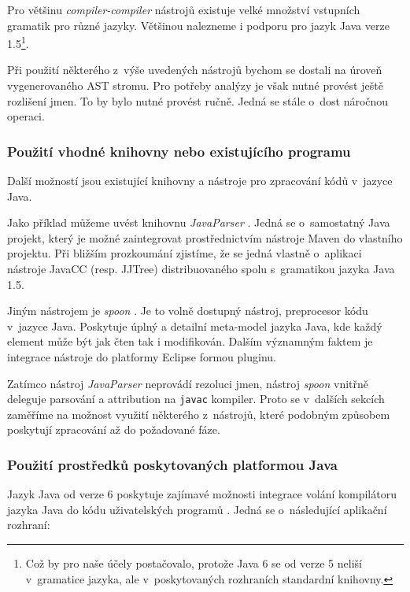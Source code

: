 \vspace{0.5cm}

Pro většinu \emph{compiler-compiler} nástrojů existuje velké množství vstupních gramatik pro různé jazyky. Většinou nalezneme i podporu pro jazyk Java verze 1.5\footnote{Což by pro naše účely postačovalo, protože Java 6 se od verze 5 neliší v~gramatice jazyka, ale v~poskytovaných rozhraních standardní knihovny.}.

Při použití některého z~výše uvedených nástrojů bychom se dostali na úroveň vygenerovaného AST stromu. Pro potřeby analýzy je však nutné provést ještě rozlišení jmen. To by bylo nutné provést ručně. Jedná se stále o~dost náročnou operaci.

\subsubsection{Použití vhodné knihovny nebo existujícího programu}
Další možností jsou existující knihovny a nástroje pro zpracování kódů v~jazyce Java.

Jako příklad můžeme uvést knihovnu \emph{JavaParser} \cite{parsertools:javaparser}. Jedná se o~samostatný Java projekt, který je možné zaintegrovat prostřednictvím nástroje Maven do vlastního projektu. Při bližším prozkoumání zjistíme, že se jedná vlastně o~aplikaci nástroje JavaCC (resp. JJTree) distribuovaného spolu s~gramatikou jazyka Java 1.5.

Jiným nástrojem je \emph{spoon} \cite{parsertools:spoon}. Je to volně dostupný nástroj, preprocesor kódu v~jazyce Java. Poskytuje úplný a detailní meta-model jazyka Java, kde každý element může být jak čten tak i modifikován. Dalším významným faktem je integrace nástroje do platformy Eclipse formou pluginu.

Zatímco nástroj \emph{JavaParser} neprovádí rezoluci jmen, nástroj \emph{spoon} vnitřně deleguje parsování a attribution na \verb+javac+ kompiler. Proto se v~dalších sekcích zaměříme na možnost využití některého z~nástrojů, které podobným způsobem poskytují zpracování až do požadované fáze.

\subsubsection{Použití prostředků poskytovaných platformou Java}
Jazyk Java od verze 6 poskytuje zajímavé možnosti integrace volání kompilátoru jazyka Java do kódu uživatelských programů \cite{source_code_analysis_corejavatechtips}. Jedná se o~následující aplikační rozhraní:

